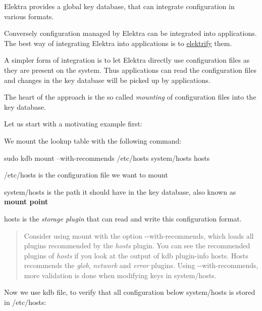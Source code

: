 Elektra provides a global key database, that can integrate configuration in various formats.

Conversely configuration managed by Elektra can be integrated into applications. The best way of integrating Elektra into applications is to \hyperlink{doc_help_elektra-glossary_md}{elektrify} them.

A simpler form of integration is to let Elektra directly use configuration files as they are present on the system. Thus applications can read the configuration files and changes in the key database will be picked up by applications.

The heart of the approach is the so called {\itshape mounting} of configuration files into the key database.

Let us start with a motivating example first\+:

We mount the lookup table with the following command\+:


\begin{DoxyCode}
sudo kdb mount --with-recommends /etc/hosts system/hosts hosts
\end{DoxyCode}



\begin{DoxyEnumerate}
\item {\ttfamily /etc/hosts} is the configuration file we want to mount
\item {\ttfamily system/hosts} is the path it should have in the key database, also known as {\bfseries mount point}
\item {\ttfamily hosts} is the {\itshape storage plugin} that can read and write this configuration format.
\end{DoxyEnumerate}

\begin{quote}
Consider using mount with the option {\ttfamily -\/-\/with-\/recommends}, which loads all plugins recommended by the {\itshape hosts} plugin. You can see the recommended plugins of {\itshape hosts} if you look at the output of {\ttfamily kdb plugin-\/info hosts}. Hosts recommends the {\itshape glob}, {\itshape network} and {\itshape error} plugins. Using {\ttfamily -\/-\/with-\/recommends}, more validation is done when modifying keys in {\ttfamily system/hosts}. \end{quote}


Now we use {\ttfamily kdb file}, to verify that all configuration below {\ttfamily system/hosts} is stored in {\ttfamily /etc/hosts}\+:


